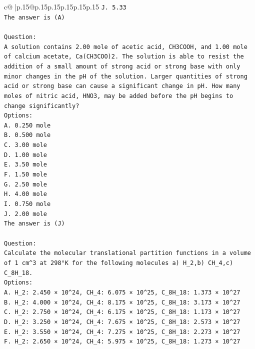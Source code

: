 \documentclass{article}
\begin{document}
{\begin{supertabular}{c@{$\;$}|p{.15\linewidth}@{}p{.15\linewidth}p{.15\linewidth}p{.15\linewidth}p{.15\linewidth}p{.15\linewidth}}
{{{\texttt{J. 5.33} \\
\texttt{The answer is (A)} \\
\\ 
\texttt{Question:} \\
\texttt{A solution contains 2.00 mole of acetic acid, CH3COOH, and 1.00 mole of calcium acetate, Ca(CH3COO)2. The solution is able to resist the addition of a small amount of strong acid or strong base with only minor changes in the pH of the solution. Larger quantities of strong acid or strong base can cause a significant change in pH. How many moles of nitric acid, HNO3, may be added before the pH begins to change significantly?} \\
\texttt{Options:} \\
\texttt{A. 0.250 mole} \\
\texttt{B. 0.500 mole} \\
\texttt{C. 3.00 mole} \\
\texttt{D. 1.00 mole} \\
\texttt{E. 3.50 mole} \\
\texttt{F. 1.50 mole} \\
\texttt{G. 2.50 mole} \\
\texttt{H. 4.00 mole} \\
\texttt{I. 0.750 mole} \\
\texttt{J. 2.00 mole} \\
\texttt{The answer is (J)} \\
\\ 
\texttt{Question:} \\
\texttt{Calculate the molecular translational partition functions in a volume of 1 cm\^{}3 at 298°K for the following molecules a) H\_2,b) CH\_4,c) C\_8H\_18.} \\
\texttt{Options:} \\
\texttt{A. H\_2: 2.450 × 10\^{}24, CH\_4: 6.075 × 10\^{}25, C\_8H\_18: 1.373 × 10\^{}27} \\
\texttt{B. H\_2: 4.000 × 10\^{}24, CH\_4: 8.175 × 10\^{}25, C\_8H\_18: 3.173 × 10\^{}27} \\
\texttt{C. H\_2: 2.750 × 10\^{}24, CH\_4: 6.175 × 10\^{}25, C\_8H\_18: 1.173 × 10\^{}27} \\
\texttt{D. H\_2: 3.250 × 10\^{}24, CH\_4: 7.675 × 10\^{}25, C\_8H\_18: 2.573 × 10\^{}27} \\
\texttt{E. H\_2: 3.550 × 10\^{}24, CH\_4: 7.275 × 10\^{}25, C\_8H\_18: 2.273 × 10\^{}27} \\
\texttt{F. H\_2: 2.650 × 10\^{}24, CH\_4: 5.975 × 10\^{}25, C\_8H\_18: 1.273 × 10\^{}27} \\
}}}
\end{supertabular}}
\end{document}
